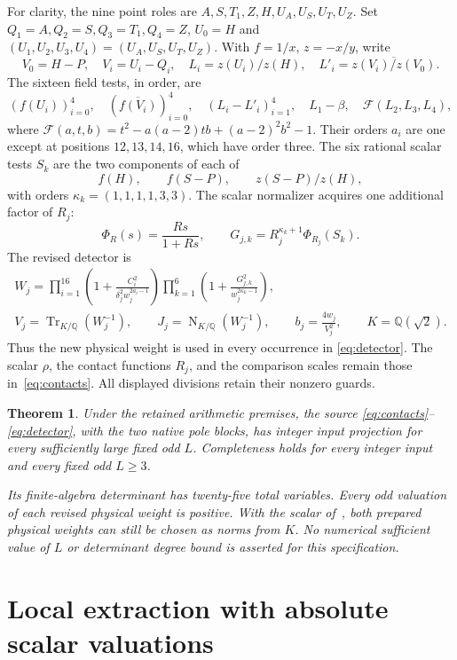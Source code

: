 \documentclass[11pt,a4paper]{article}
\newtheorem{theorem}{Theorem}[section]
\newcommand{\Q}{\mathbb Q}\newcommand{\Z}{\mathbb Z}
\DeclareMathOperator{\Tr}{Tr}\DeclareMathOperator{\Nm}{N}
\begin{document}
For clarity, the nine point roles are
$A,S,T_1,Z,H,U_A,U_S,U_T,U_Z$. Set
$Q_1=A,Q_2=S,Q_3=T_1,Q_4=Z$, $U_0=H$ and
$(U_1,U_2,U_3,U_4)=(U_A,U_S,U_T,U_Z)$. With
$f=1/x$, $z=-x/y$, write
\[
 V_0=H-P,\quad V_i=U_i-Q_i,\quad
 L_i=z(U_i)/z(H),\quad
 L'_i=\overline{z(V_i)/z(V_0)}.
\]
The sixteen field tests, in order, are
\[
 (f(U_i))_{i=0}^{4},\quad
 (\overline{f(V_i)})_{i=0}^{4},\quad
 (L_i-L'_i)_{i=1}^{4},\quad
 L_1-\beta,\quad \mathcal F(L_2,L_3,L_4),
\]
where
$\mathcal F(a,t,b)=t^2-a(a-2)tb+(a-2)^2b^2-1$.
Their orders $a_i$ are one except at positions $12,13,14,16$,
which have order three. The six rational scalar tests $S_k$ are
the two components of each of
\[
                     f(H),\qquad f(S-P),\qquad z(S-P)/z(H),
\]
with orders $\kappa_k=(1,1,1,1,3,3)$.
The scalar normalizer acquires one additional factor of $R_j$:
\[
 \Phi_R(s)=\frac{Rs}{1+Rs},\qquad
 G_{j,k}=R_j^{\kappa_k+1}\Phi_{R_j}(S_k).
\]
The revised detector is
\begin{equation}\label{eq:detector}
\begin{gathered}
 W_j=\prod_{i=1}^{16}
   \left(1+\frac{C_i^2}{\delta_j^2 w_j^{2a_i-1}}\right)
   \prod_{k=1}^{6}
   \left(1+\frac{G_{j,k}^2}{w_j^{2\kappa_k-1}}\right),\\
 V_j=\Tr_{K/\Q}(W_j^{-1}),\qquad
 J_j=\Nm_{K/\Q}(W_j^{-1}),\qquad
 b_j=\frac{4w_j}{V_j^2},\qquad K=\Q(\sqrt2).
\end{gathered}
\end{equation}
Thus the new physical weight is used in every occurrence in
\eqref{eq:detector}. The scalar $\rho$, the contact functions $R_j$,
and the comparison scales remain those in~\eqref{eq:contacts}.
All displayed divisions retain their nonzero guards.

\begin{theorem}\label{thm:source}
Under the retained arithmetic premises, the source
\eqref{eq:contacts}--\eqref{eq:detector}, with the two native pole
blocks, has integer input projection for every sufficiently large
fixed odd $L$. Completeness holds for every integer input and every
fixed odd $L\ge3$.

Its finite-algebra determinant has twenty-five total variables.
Every odd valuation of each revised physical weight is positive.
With the scalar of~\cite{Aligned}, both prepared physical weights
can still be chosen as norms from $K$. No numerical sufficient value
of $L$ or determinant degree bound is asserted for this specification.
\end{theorem}

\section{Local extraction with absolute scalar valuations}
\end{document}
